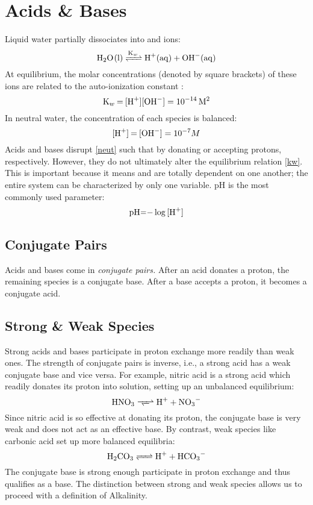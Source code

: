 \chapter{Acids \& Bases}\label{acidbase}
Liquid water partially dissociates into  and  ions:
\[\ce{H2O(l) <=>[K_w] H+(aq) + OH-(aq)}\]
At equilibrium, the molar concentrations (denoted by square brackets) of these ions are related to the auto-ionization constant :
\begin{equation}
    \ce{K_w = [H+][OH^-]}=\qty{e-14}{M\squared}\label{kw}
\end{equation}
In neutral water, the concentration of each species is balanced:
\begin{equation}
    \ce{[H+] = [OH^-]}=10^{-7}M\label{neut}
\end{equation}
Acids and bases disrupt \eqref{neut} such that \ce{[H+] \neq [OH^-]} by donating or accepting protons, respectively. However, they do not ultimately alter the equilibrium relation \eqref{kw}. This is important because it means \ce{[H+]} and \ce{[OH-]} are totally dependent on one another; the entire system can be characterized by only one variable. pH is the most commonly used parameter:
\[\ce{pH=-\log[H+]}\]
\section{Conjugate Pairs}
Acids and bases come in \textit{conjugate pairs.} After an acid donates a proton, the remaining species is a conjugate base. After a base accepts a proton, it becomes a conjugate acid.
\section{Strong \& Weak Species}
Strong acids and bases participate in proton exchange more readily than weak ones. The strength of conjugate pairs is inverse, i.e., a strong acid has a weak conjugate base and vice versa.
For example, nitric acid is a strong acid which readily donates its proton into solution, setting up an unbalanced equilibrium:
\[\ce{HNO3 <=>> H+ + NO3^-}\]
Since nitric acid is so effective at donating its proton, the conjugate base  is very weak and does not act as an effective base. By contrast, weak species like carbonic acid set up more balanced equilibria:
\[\ce{H2CO3 <=> H+ + HCO3-}\]
The conjugate base  is strong enough participate in proton exchange and thus qualifies as a base. The distinction between strong and weak species allows us to proceed with a definition of Alkalinity.